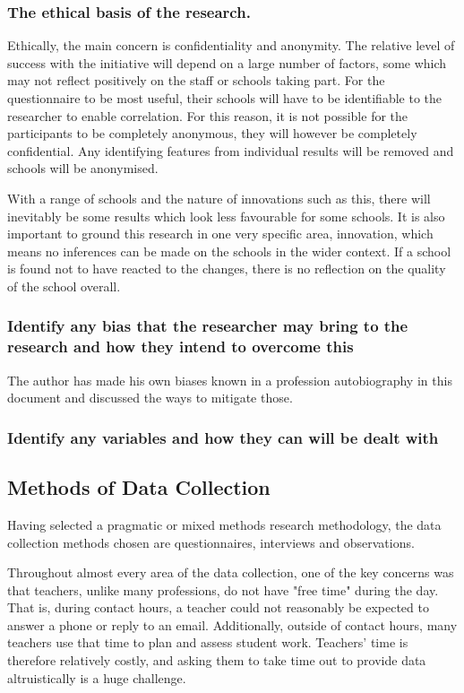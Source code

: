 \subsubsection{The ethical basis of the research.}
Ethically, the main concern is confidentiality and anonymity. The relative level of success with the initiative will depend on a large number of factors, some which may not reflect positively on the staff or schools taking part. For the questionnaire to be most useful, their schools will have to be identifiable to the researcher to enable correlation. For this reason, it is not possible for the participants to be completely anonymous, they will however be completely confidential. Any identifying features from individual results will be removed and schools will be anonymised. 

With a range of schools and the nature of innovations such as this, there will inevitably be some results which look less favourable for some schools. It is also important to ground this research in one very specific area, innovation, which means no inferences can be made on the schools in the wider context. If a school is found not to have reacted to the changes, there is no reflection on the quality of the school overall.

\subsubsection{Identify any bias that the researcher may bring to the research and how they intend to overcome this}

The author has made his own biases known in a profession autobiography in this document and discussed the ways to mitigate those.

\subsubsection{Identify any variables and how they can will be dealt with}

\subsection{Methods of Data Collection}
Having selected a pragmatic or mixed methods research methodology, the data collection methods chosen are questionnaires, interviews and observations.

Throughout almost every area of the data collection, one of the key concerns was that teachers, unlike many professions, do not have "free time" during the day. That is, during contact hours, a teacher could not reasonably be expected to answer a phone or reply to an email. Additionally, outside of contact hours, many teachers use that time to plan and assess student work. Teachers' time is therefore relatively costly, and asking them to take time out to provide data altruistically is a huge challenge.

